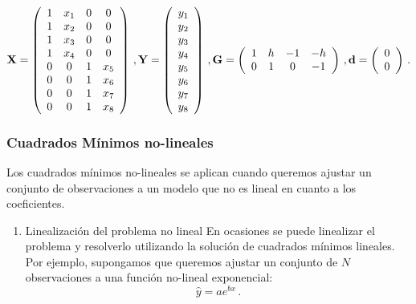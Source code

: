 \documentclass[
]{agujournal2019}
\providecommand{\tightlist}{%
  \setlength{\itemsep}{0pt}\setlength{\parskip}{0pt}}\usepackage{longtable,booktabs,array}
\begin{document}
\[{\textbf X}=\left(\begin{array}{cccccccc}
  1 & x_1  & 0 & 0 \\
  1 & x_2   & 0 & 0 \\
  1 & x_3   & 0 & 0\\
  1 & x_4   & 0 & 0 \\
  0 & 0  & 1 & x_5 \\
  0 & 0   & 1 & x_6 \\
  0 & 0   & 1 & x_7\\
  0 & 0   & 1 & x_8 \\
  \end{array}\right)\,,
{\textbf Y}=\left(\begin{array}{c}
    y_1 \\ y_2 \\ y_3 \\ y_4 \\ y_5\\ y_6\\y_7\\y_8
      \end{array}\right)\,,
{\textbf G}=\left(\begin{array}{cccccccc}
        1 & h & -1&-h\\
        0 & 1& 0&-1\\
          \end{array}\right)\,,
{\textbf d}=\left(\begin{array}{c}
            0\\
            0\\
              \end{array}\right)\,.
  \]

\vspace{0.5cm}

\hfill\break

\subsubsection{\texorpdfstring{Cuadrados Mínimos no-lineales\\
}{Cuadrados Mínimos no-lineales }}\label{cuadrados-muxednimos-no-lineales}

\noindent Los cuadrados mínimos no-lineales se aplican cuando queremos
ajustar un conjunto de observaciones a un modelo que no es lineal en
cuanto a los coeficientes.

\vspace{0.5cm}

\begin{enumerate}
\def\labelenumi{\arabic{enumi}.}
\tightlist
\item
  Linealización del problema no lineal En ocasiones se puede linealizar
  el problema y resolverlo utilizando la solución de cuadrados mínimos
  lineales. Por ejemplo, supongamos que queremos ajustar un conjunto de
  \(N\) observaciones a una función no-lineal exponencial:
  \[\hat{y}=a e^{bx}\,.\]
\end{enumerate}
\end{document}
